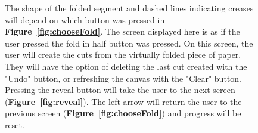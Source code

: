 \documentclass[11pt]{article}
\begin{document}
\begin{figure}
                \begin{minipage}[c]{0.65\textwidth}
                \caption{The shape of the folded segment and dashed lines indicating creases will depend on which button was pressed in \textbf{Figure~\ref{fig:chooseFold}}. The screen displayed here is as if the user pressed the fold in half button was pressed. On this screen, the user will create the cuts from the virtually folded piece of paper. They will have the option of deleting the last cut created with the "Undo" button, or refreshing the canvas with the "Clear" button. Pressing the reveal button will take the user to the next screen (\textbf{Figure~\ref{fig:reveal}}). The left arrow will return the user to the previous screen (\textbf{Figure~\ref{fig:chooseFold}}) and progress will be reset.}
                \label{fig:createPattern}
                \end{minipage}
            \end{figure}
            
\end{document}
